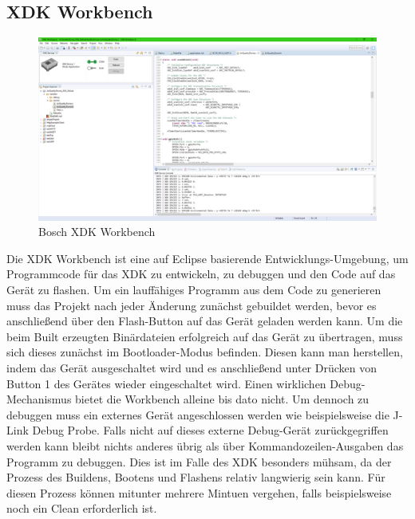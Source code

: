 \subsection{\acs{XDK} Workbench}\label{subsec:XDK Workbench}
\begin{figure}[H]
	\centering
	\includegraphics[width=12cm]{images/XDK_Workbench.png}	
	\caption{Bosch \acs*{XDK} Workbench}
	\label{fig:XDK_Workbench}
\end{figure}
Die \acs{XDK} Workbench ist eine auf Eclipse basierende Entwicklungs-Umgebung, um Programmcode für das XDK zu entwickeln, zu debuggen und den Code auf das Gerät zu flashen.
Um ein lauffähiges Programm aus dem Code zu generieren muss das Projekt nach jeder Änderung zunächst gebuildet werden, bevor es anschließend über den Flash-Button auf das Gerät geladen werden kann. Um die beim Built erzeugten Binärdateien erfolgreich auf das Gerät zu übertragen, muss sich dieses zunächst im Bootloader-Modus befinden. Diesen kann man herstellen, indem das Gerät ausgeschaltet wird und es anschließend unter Drücken von Button 1 des Gerätes wieder eingeschaltet wird.\newline
Einen wirklichen Debug-Mechanismus bietet die Workbench alleine bis dato nicht. Um dennoch zu debuggen muss ein externes Gerät angeschlossen werden wie beispielsweise die J-Link Debug Probe. \newline
Falls nicht auf dieses externe Debug-Gerät zurückgegriffen werden kann bleibt nichts anderes übrig als über Kommandozeilen-Ausgaben das Programm zu debuggen. Dies ist im Falle des XDK besonders mühsam, da der Prozess des Buildens, Bootens und Flashens relativ langwierig sein kann. Für diesen Prozess können mitunter mehrere Mintuen vergehen, falls beispielsweise noch ein Clean erforderlich ist.

